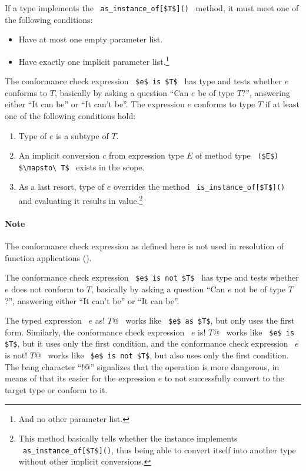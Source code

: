 If a type implements the ~\lstinline!as_instance_of[$T$]()!~ method, it must meet one of the following conditions:
\begin{itemize}
  \item Have at most one empty parameter list.
  \item Have exactly one implicit parameter list.\footnote{And no other parameter list.}
\end{itemize}

The conformance check expression ~\lstinline!$e$ is $T$!~ has type  and tests whether $e$ conforms to $T$, basically by asking a question ``Can $e$ be of type $T$?'', answering either ``It can be'' or ``It can't be''. The expression $e$ conforms to type $T$ if at least one of the following conditions hold:
\begin{enumerate}
  \item Type of $e$ is a subtype of $T$. 
  \item An implicit conversion $c$ from expression type $E$ of method type ~\lstinline!($E$) $\mapsto\ T$!~ exists in the scope. 
  \item As a last resort, type of $e$ overrides the method ~\lstinline!is_instance_of[$T$]()!~ and evaluating it results in  value.\footnote{This method basically tells whether the instance implements ~\lstinline!as_instance_of[$T$]()!, thus being able to convert itself into another type without other implicit conversions.}
\end{enumerate}

\paragraph{Note} 
The conformance check expression as defined here is not used in resolution of function applications ().

The conformance check expression ~\lstinline!$e$ is not $T$!~ has type  and tests whether $e$ does not conform to $T$, basically by asking a question ``Can $e$ not be of type $T$?'', answering either ``It can't be'' or ``It can be''.

The typed expression ~\lstinline@$e$ as! $T$@~ works like ~\lstinline!$e$ as $T$!, but only uses the first form. Similarly, the conformance check expression ~\lstinline@$e$ is! $T$@~ works like ~\lstinline!$e$ is $T$!, but it uses only the first condition, and the conformance check expression ~\lstinline@$e$ is not! $T$@~ works like ~\lstinline!$e$ is not $T$!, but also uses only the first condition. The bang character ``\lstinline@!@'' signalizes that the operation is more dangerous, in means of that its easier for the expression $e$ to not successfully convert to the target type or conform to it. 

